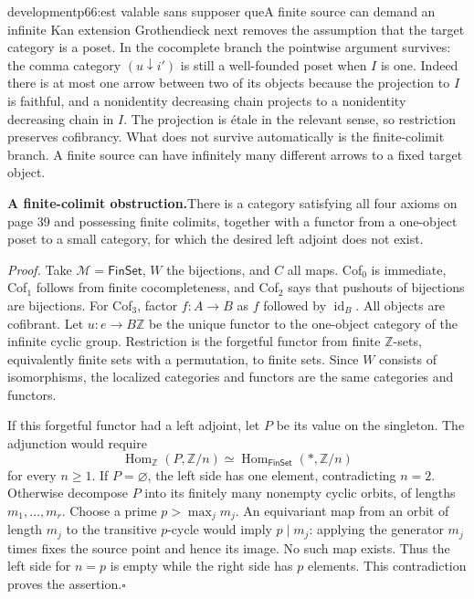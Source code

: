 \begin{dcomment}{development}{p66:est valable sans supposer que}{A finite source can demand an infinite Kan extension}
Grothendieck next removes the assumption that the target category is a poset. In the cocomplete branch the pointwise argument survives: the comma category $(u\downarrow i')$ is still a well-founded poset when $I$ is one. Indeed there is at most one arrow between two of its objects because the projection to $I$ is faithful, and a nonidentity decreasing chain projects to a nonidentity decreasing chain in $I$. The projection is étale in the relevant sense, so restriction preserves cofibrancy. What does not survive automatically is the finite-colimit branch. A finite source can have infinitely many different arrows to a fixed target object.

\textbf{A finite-colimit obstruction.}\ours\quad There is a category satisfying all four axioms on page 39 and possessing finite colimits, together with a functor from a one-object poset to a small category, for which the desired left adjoint does not exist.

\textit{Proof.} Take $\mathcal M=\mathsf{FinSet}$, $W$ the bijections, and $C$ all maps. Cof$_0$ is immediate, Cof$_1$ follows from finite cocompleteness, and Cof$_2$ says that pushouts of bijections are bijections. For Cof$_3$, factor $f:A\to B$ as $f$ followed by $\operatorname{id}_B$. All objects are cofibrant. Let $u:e\to B\mathbb Z$ be the unique functor to the one-object category of the infinite cyclic group. Restriction is the forgetful functor from finite $\mathbb Z$-sets, equivalently finite sets with a permutation, to finite sets. Since $W$ consists of isomorphisms, the localized categories and functors are the same categories and functors.

If this forgetful functor had a left adjoint, let $P$ be its value on the singleton. The adjunction would require
\[
 \operatorname{Hom}_{\mathbb Z}(P,\mathbb Z/n)
       \simeq\operatorname{Hom}_{\mathsf{FinSet}}(*,\mathbb Z/n)
\]
for every $n\geq1$. If $P=\varnothing$, the left side has one element, contradicting $n=2$. Otherwise decompose $P$ into its finitely many nonempty cyclic orbits, of lengths $m_1,\ldots,m_r$. Choose a prime $p>\max_j m_j$. An equivariant map from an orbit of length $m_j$ to the transitive $p$-cycle would imply $p\mid m_j$: applying the generator $m_j$ times fixes the source point and hence its image. No such map exists. Thus the left side for $n=p$ is empty while the right side has $p$ elements. This contradiction proves the assertion.\hfill$\square$


\end{dcomment}
